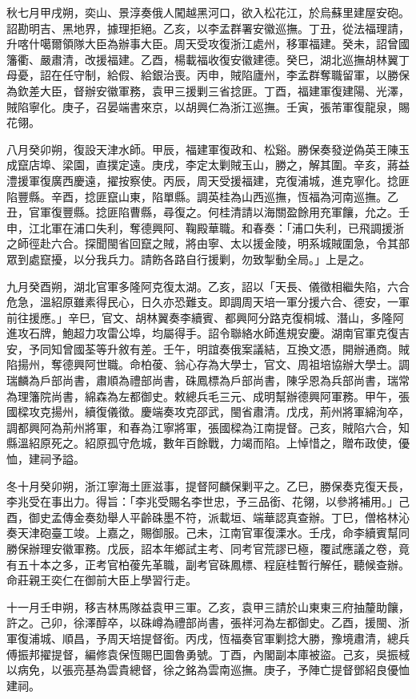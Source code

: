 \begin{pinyinscope}
秋七月甲戌朔，奕山、景淳奏俄人闖越黑河口，欲入松花江，於烏蘇里建屋安砲。詔勘明吉、黑地界，據理拒絕。乙亥，以李孟群署安徽巡撫。丁丑，從法福理請，升喀什噶爾領隊大臣為辦事大臣。周天受攻復浙江處州，移軍福建。癸未，詔曾國籓衢、嚴肅清，改援福建。乙酉，楊載福收復安徽建德。癸巳，湖北巡撫胡林翼丁母憂，詔在任守制，給假、給銀治喪。丙申，賊陷廬州，李孟群奪職留軍，以勝保為欽差大臣，督辦安徽軍務，袁甲三援剿三省捻匪。丁酉，福建軍復建陽、光澤，賊陷寧化。庚子，召晏端書來京，以胡興仁為浙江巡撫。壬寅，張芾軍復龍泉，賜花翎。

八月癸卯朔，復設天津水師。甲辰，福建軍復政和、松谿。勝保奏發逆偽英王陳玉成竄店埠、梁園，直撲定遠。庚戌，李定太剿賊玉山，勝之，解其圍。辛亥，蔣益澧援軍復廣西慶遠，擢按察使。丙辰，周天受援福建，克復浦城，進克寧化。捻匪陷豐縣。辛酉，捻匪竄山東，陷單縣。調英桂為山西巡撫，恆福為河南巡撫。乙丑，官軍復豐縣。捻匪陷曹縣，尋復之。何桂清請以海關盈餘用充軍饟，允之。壬申，江北軍在浦口失利，奪德興阿、鞠殿華職。和春奏：「浦口失利，已飛調援浙之師徑赴六合。探聞閩省回竄之賊，將由寧、太以援金陵，明系城賊圍急，令其部眾到處竄擾，以分我兵力。請飭各路自行援剿，勿致掣動全局。」上是之。

九月癸酉朔，湖北官軍多隆阿克復太湖。乙亥，詔以「天長、儀徵相繼失陷，六合危急，溫紹原雖素得民心，日久亦恐難支。即調周天培一軍分援六合、德安，一軍前往援應。」辛巳，官文、胡林翼奏李續賓、都興阿分路克復桐城、潛山，多隆阿進攻石牌，鮑超力攻雷公埠，均屬得手。詔令聯絡水師進規安慶。湖南官軍克復吉安，予同知曾國荃等升敘有差。壬午，明誼奏俄案議結，互換文憑，開辦通商。賊陷揚州，奪德興阿世職。命柏葰、翁心存為大學士，官文、周祖培協辦大學士。調瑞麟為戶部尚書，肅順為禮部尚書，硃鳳標為戶部尚書，陳孚恩為兵部尚書，瑞常為理籓院尚書，綿森為左都御史。敕總兵毛三元、成明幫辦德興阿軍務。甲午，張國樑攻克揚州，續復儀徵。慶端奏攻克邵武，閩省肅清。戊戌，荊州將軍綿洵卒，調都興阿為荊州將軍，和春為江寧將軍，張國樑為江南提督。己亥，賊陷六合，知縣溫紹原死之。紹原孤守危城，數年百餘戰，力竭而陷。上悼惜之，贈布政使，優恤，建祠予謚。

冬十月癸卯朔，浙江寧海土匪滋事，提督阿麟保剿平之。乙巳，勝保奏克復天長，李兆受在事出力。得旨：「李兆受賜名李世忠，予三品銜、花翎，以參將補用。」己酉，御史孟傳金奏劾舉人平齡硃墨不符，派載垣、端華認真查辦。丁巳，僧格林沁奏天津砲臺工竣。上嘉之，賜御服。己未，江南官軍復溧水。壬戌，命李續賓幫同勝保辦理安徽軍務。戊辰，詔本年鄉試主考、同考官荒謬已極，覆試應議之卷，竟有五十本之多，正考官柏葰先革職，副考官硃鳳標、程庭桂暫行解任，聽候查辦。命莊親王奕仁在御前大臣上學習行走。

十一月壬申朔，移吉林馬隊益袁甲三軍。乙亥，袁甲三請於山東東三府抽釐助饟，許之。己卯，徐澤醇卒，以硃嶟為禮部尚書，張祥河為左都御史。乙酉，援閩、浙軍復浦城、順昌，予周天培提督銜。丙戌，恆福奏官軍剿捻大勝，豫境肅清，總兵傅振邦擢提督，編修袁保恆賜巴圖魯勇號。丁酉，內閣副本庫被盜。己亥，吳振棫以病免，以張亮基為雲貴總督，徐之銘為雲南巡撫。庚子，予陣亡提督鄧紹良優恤建祠。


\end{pinyinscope}
